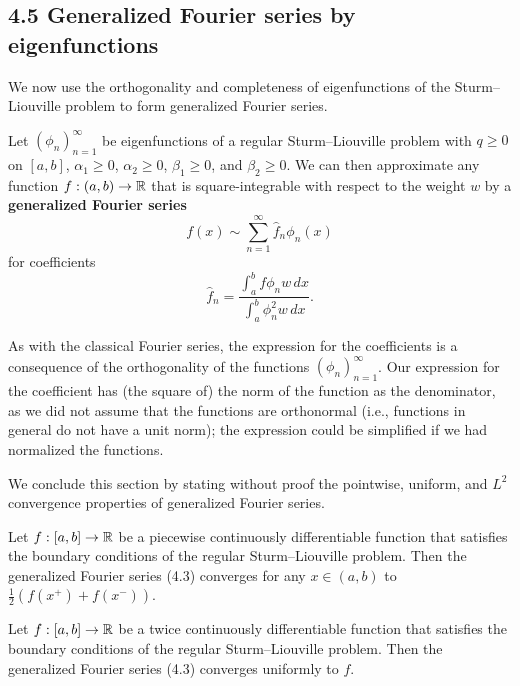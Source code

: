 \subsection{4.5 Generalized Fourier series by eigenfunctions}
We now use the orthogonality and completeness of eigenfunctions of the Sturm--Liouville problem to form generalized Fourier series.

\begin{definition}
    Let $(\phi_n)_{n=1}^{\infty}$ be eigenfunctions of a regular Sturm--Liouville problem with $q \geq 0$ on $[a, b]$, $\alpha_1 \geq 0$, $\alpha_2 \geq 0$, $\beta_1 \geq 0$, and $\beta_2 \geq 0$. We can then approximate any function $f : (a, b) \to \mathbb{R}$ that is square-integrable with respect to the weight $w$ by a \textbf{generalized Fourier series}
    \begin{equation*}
        f(x) \sim \sum_{n=1}^{\infty} \hat{f}_n \phi_n(x) \tag{4.3}
    \end{equation*}
    for coefficients
    \[\hat{f}_n = \frac{\int_a^b f \phi_n w\,dx}{\int_a^b \phi_n^2 w\,dx}.\]
\end{definition}

As with the classical Fourier series, the expression for the coefficients is a consequence of the orthogonality of the functions $(\phi_n)_{n=1}^{\infty}$. Our expression for the coefficient has (the square of) the norm of the function as the denominator, as we did not assume that the functions are orthonormal (i.e., functions in general do not have a unit norm); the expression could be simplified if we had normalized the functions.

We conclude this section by stating without proof the pointwise, uniform, and $L^2$ convergence properties of generalized Fourier series.

\begin{theorem}
    Let $f : [a, b] \to \mathbb{R}$ be a piecewise continuously differentiable function that satisfies the boundary conditions of the regular Sturm--Liouville problem. Then the generalized Fourier series (4.3) converges for any $x \in (a, b)$ to $\frac{1}{2}(f(x^+) + f(x^-))$.
\end{theorem}

\begin{theorem}
    Let $f : [a, b] \to \mathbb{R}$ be a twice continuously differentiable function that satisfies the boundary conditions of the regular Sturm--Liouville problem. Then the generalized Fourier series (4.3) converges uniformly to $f$.
\end{theorem}

